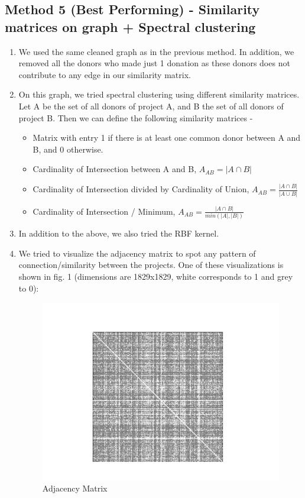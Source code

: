 \documentclass{article}
\begin{document}
\subsection*{Method 5 (Best Performing) - Similarity matrices on graph + Spectral clustering}
\begin{enumerate}
    \item We used the same cleaned graph as in the previous method. In addition, we removed all the donors who made just 1 donation as these donors does not contribute to any edge in our similarity matrix. 
\item On this graph, we tried spectral clustering using different similarity matrices. Let A be the set of all donors of project A, and B the set of all donors of project B. Then we can define the following similarity matrices - 
\begin{itemize}
\item Matrix with entry 1 if there is at least one common donor between A and B, and 0 otherwise. 
\item Cardinality of Intersection between A and B, $A_{AB}=|A \cap B|$
\item Cardinality of Intersection divided by Cardinality of Union, $A_{AB}= \frac{|A \cap B|}{|A \cup B|}$
\item Cardinality of Intersection / Minimum, $A_{AB}=\frac{|A \cap B|}{min( |A|, |B| )}$
\end{itemize}
\item In addition to the above, we also tried the RBF kernel. 
\item We tried to visualize the adjacency matrix to spot any pattern of connection/similarity between the projects. One of these visualizations is shown in fig. 1 (dimensions are 1829x1829, white corresponds to 1 and grey to 0):
\begin{figure}[H]
\centering
\includegraphics[width=14cm]{adMat.png}
\caption{Adjacency Matrix}
\label{Fig1: Adjacency Matrix(2a)}
\end{figure}


\end{enumerate}
\end{document}
